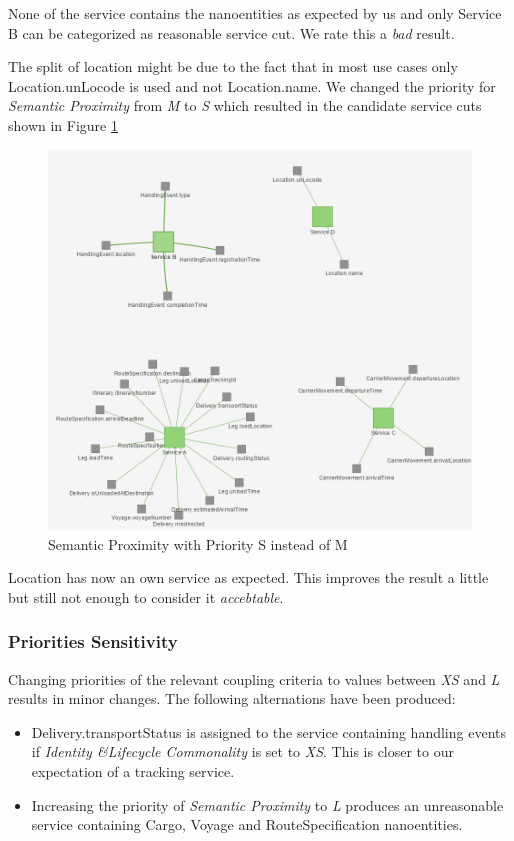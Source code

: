 None of the service contains the nanoentities as expected by us and only Service B can be categorized as reasonable service cut. We rate this a \textit{bad} result. 

The split of location might be due to the fact that in most use cases only Location.unLocode is used and not Location.name. We changed the priority for \textit{Semantic Proximity} from \textit{M} to \textit{S} which resulted in the candidate service cuts shown in Figure \ref{fig:dddGirvanNewmanS}

\begin{figure}[H]
	\includegraphics[scale=0.7]{images/ddd_girvan_4_proximity_s.png}
	\caption{Semantic Proximity with Priority S instead of M}
	\label{fig:dddGirvanNewmanS}
\end{figure}

Location has now an own service as expected. This improves the result a little but still not enough to consider it \textit{accebtable}.

\subsubsection{Priorities Sensitivity}

Changing priorities of the relevant coupling criteria to values between \textit{XS} and \textit{L} results in minor changes. The following alternations have been produced:

\begin{itemize}
	\item Delivery.transportStatus is assigned to the service containing handling events if \textit{Identity \&Lifecycle Commonality} is set to \textit{XS}. This is closer to our expectation of a tracking service.
	\item Increasing the priority of \textit{Semantic Proximity} to \textit{L} produces an unreasonable service containing Cargo, Voyage and RouteSpecification nanoentities.
\end{itemize}

